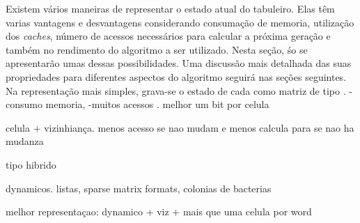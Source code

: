 Existem vários maneiras de representar o estado atual do tabuleiro. Elas têm varias vantagens e desvantagens considerando consumação de memoria, utilização dos \textit{caches}, número de acessos necessários para calcular a próxima geração e também no rendimento do algoritmo a ser utilizado. Nesta seção, śo se apresentarão umas dessas possibilidades. Uma discussão mais detalhada das suas propriedades para diferentes aspectos do algoritmo seguirá nas seções seguintes.\\

Na representação mais simples, grava-se o estado de cada como matriz de tipo . -consumo memoria, -muitos acessos . melhor um bit por celula

celula + vizinhiança. menos acesso se  nao mudam e menos calcula para se nao ha mudanza

tipo hibrido


dynamicos. listas, sparse matrix formats, colonias de bacterias

melhor representaçao: dynamico + viz + mais que uma celula por word

